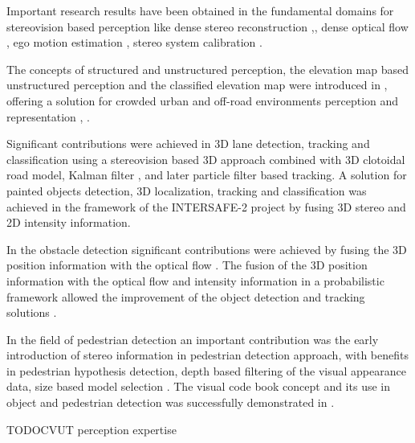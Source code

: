 Important research results have been obtained in the fundamental domains for stereovision based perception like dense stereo reconstruction \cite{utc-Pantilie},\cite{utc-Haller}, dense optical flow \cite{utc-Drulea}, ego motion estimation \cite{utc-Szakats}, stereo system calibration \cite{utc-Nedevschi-calibration}.

The concepts of structured and unstructured perception, the elevation map based unstructured perception and the classified elevation map were introduced in \cite{utc-Nedevschi-ASensor}, \cite{utc-Oniga-ProcessingDense} offering a solution for crowded urban and off-road environments perception and representation \cite{utc-Danescu-Modeling}, \cite{utc-Danescu-AParticle}.

Significant contributions were achieved in 3D lane detection, tracking and classification using a stereovision based 3D approach combined with 3D clotoidal road model, Kalman filter \cite{utc-Nedevschi-HighAccuracy}, \cite{utc-Nedevschi-3DLane} and later particle filter \cite{utc-Danescu-ProbabilisticLane} based tracking. A solution for painted objects detection, 3D localization, tracking and classification was achieved in the framework of the INTERSAFE-2 project \cite{utc-Danescu-Detection} by fusing 3D stereo and 2D intensity information.

In the obstacle detection significant contributions were achieved by fusing the 3D position information with the optical flow \cite{utc-Nedevschi-OnBoard} \cite{utc-Pantilie-RealTime}. The fusion of the 3D position information with the optical flow and intensity information in a probabilistic framework allowed the improvement of the object detection \cite{utc-Giosan-Superpixels} and tracking solutions \cite{utc-Bota}.

In the field of pedestrian detection an important contribution was the early introduction of stereo information in pedestrian detection approach, with benefits in pedestrian hypothesis detection, depth based filtering of the visual appearance data, size based model selection \cite{utc-Nedevschi-Stereo}.
The visual code book concept and its use in object and pedestrian detection was successfully demonstrated in \cite{utc-Costea-WordChannel}.  




TODOCVUT perception expertise 

